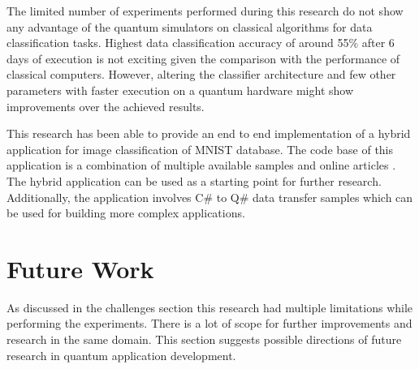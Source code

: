 \documentclass[english,a4paper,11pt,oneside,onecolumn]{book}
\begin{document}
The limited number of experiments performed during this research do not show any advantage of the quantum simulators on classical algorithms for data classification tasks. Highest data classification accuracy of around 55\% after 6 days of execution is not exciting given the comparison with the performance of classical computers. However, altering the classifier architecture and few other parameters with faster execution on a quantum hardware might show improvements over the achieved results. 

This research has been able to provide an end to end implementation of a hybrid application for image classification of MNIST database. The code base of this application is a combination of multiple available samples and online articles \cite{mykhailova_2020_microsoftquantumkatas, granade_2020_microsoftquantum}. The hybrid application can be used as a starting point for further research. Additionally, the application involves C\# to Q\# data transfer samples which can be used for building more complex applications.

\section{Future Work}
As discussed in the challenges section this research had multiple limitations while performing the experiments. There is a lot of scope for further improvements and research in the same domain. This section suggests possible directions of future research in quantum application development.
\end{document}
